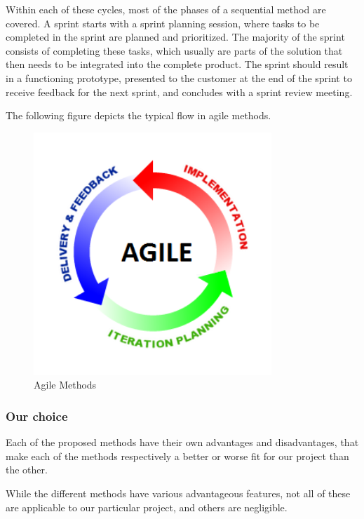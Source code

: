 Within each of these cycles, most of the phases of a sequential method are covered. A sprint starts with a sprint planning session, where tasks to be completed in the sprint are planned and prioritized. The majority of the sprint consists of completing these tasks, which usually are parts of the solution that then needs to be integrated into the complete product. The sprint should result in a functioning prototype, presented to the customer at the end of the sprint to receive feedback for the next sprint, and concludes with a sprint review meeting.

The following figure depicts the typical flow in agile methods.

\begin{figure}[H]
\centering
\includegraphics[width=0.8\textwidth]{images/agile-methods.png}
\caption{Agile Methods \cite{agileModel}}
\label{fig:agile_model}
\end{figure}

\subsubsection{Our choice}
Each of the proposed methods have their own advantages and disadvantages, that make each of the methods respectively a better or worse fit for our project than the other.

While the different methods have various advantageous features, not all of these are applicable to our particular project, and others are negligible.

